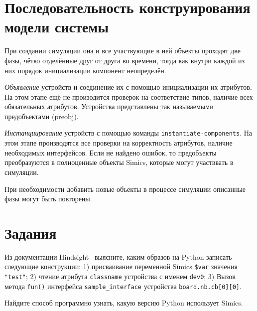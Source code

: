 \todo 


\section{Последовательность конструирования модели системы}

При создании симуляции она и все участвующие в ней объекты проходят две фазы, чётко отделённые друг от друга во времени, тогда как внутри каждой из них порядок инициализации компонент неопределён.

\begin{enumerate*}

\item \textit{Объявление} устройств и соединение их с помощью инициализации их атрибутов. На этом этапе ещё не произодится проверок на соответствие типов, наличие всех обязательных атрибутов. Устройства представлены так называемыми предобъектами (\abbr preobj).

\item \textit{Инстанциирование} устройств с помощью команды \texttt{instantiate-components}. На этом этапе производятся все проверки на корректность атрибутов, наличие необходимых интерфейсов. Если не найдено ошибок, то предобъекты преобразуются в полноценные объекты Simics, которые могут участввать в симуляции.

\end{enumerate*}

При необходимости добавить новые объекты в процессе симуляции описанные фазы могут быть повторены.

\section{Задания}

\begin{enumerate*}
\item Из документации Hindsight~\cite{hindsight} выясните, каким образов на Python записать следующие конструкции: 1) присваивание переменной Simics \texttt{\$var} значения \texttt{"test"}; 2) чтение атрибута \texttt{classname} устройства с именем \texttt{dev0}; 3) Вызов метода \texttt{fun()} интерфейса \texttt{sample_interface} устройства \texttt{board.nb.cb[0][0]}.
\item Найдите способ программно узнать, какую версию Python использует Simics.
\item 
\end{enumerate*}


